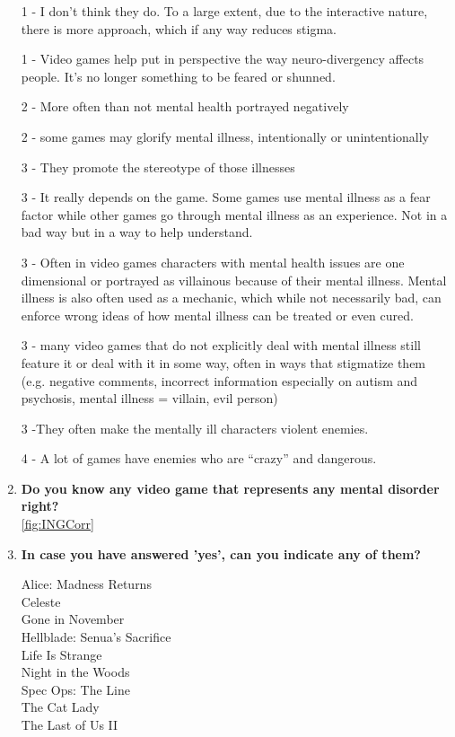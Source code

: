 \documentclass[12pt, a4paper,twoside,titlepage]{book}
\begin{document}
\begin{enumerate}[label=\textbf{\arabic*}.]
    1 - I don't think they do. To a large extent, due to the interactive nature, there is more approach, which if any way reduces stigma.
    
    
    1 - Video games help put in perspective the way neuro-divergency affects people. It’s no longer something to be feared or shunned.
    
    2 - More often than not mental health portrayed negatively
    
    2 - some games may glorify mental illness, intentionally or unintentionally
    
    3 - They promote the stereotype of those illnesses
    
    3 - It really depends on the game. Some games use mental illness as a fear factor while other games go through mental illness as an experience. Not in a bad way but in a way to help understand.
    
    3 - Often in video games characters with mental health issues are one dimensional or portrayed as villainous because of their mental illness. Mental illness is also often used as a mechanic, which while not necessarily bad, can enforce wrong ideas of how mental illness can be treated or even cured.
    
    3 - many video games that do not explicitly deal with mental illness still feature it or deal with it in some way, often in ways that stigmatize them (e.g. negative comments, incorrect information especially on autism and psychosis, mental illness = villain, evil person)
    
    3 -They often make the mentally ill characters violent enemies.
    
    4 - A lot of games have enemies who are ``crazy'' and dangerous.

     
     \item \textbf{Do you know any video game that represents any mental disorder right? }\\
     \ref{fig:INGCorr}
     \item \textbf{In case you have answered 'yes', can you indicate any of them?}
     
     Alice: Madness Returns \\
    Celeste\\
    Gone in November\\
    Hellblade: Senua's Sacrifice\\
    Life Is Strange\\
    Night in the Woods\\
    Spec Ops: The Line\\
    The Cat Lady\\
    The Last of Us II


\end{enumerate}
\end{document}
